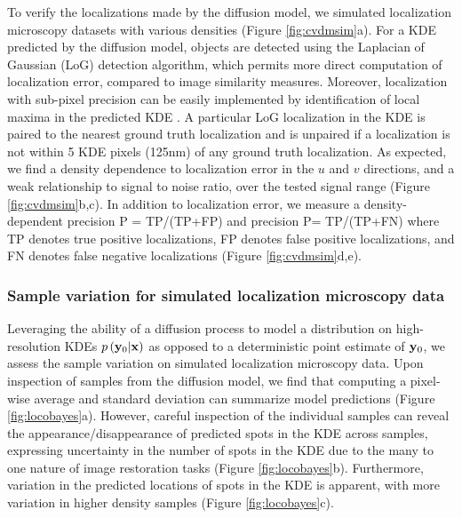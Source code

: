 To verify the localizations made by the diffusion model, we simulated localization microscopy datasets with various densities (Figure \ref{fig:cvdmsim}a). For a KDE predicted by the diffusion model, objects are detected using the Laplacian of Gaussian (LoG) detection algorithm, which permits more direct computation of localization error, compared to image similarity measures. Moreover, localization with sub-pixel precision can be easily implemented by identification of local maxima in the predicted KDE \parencite{Nehme2020}. A particular LoG localization in the KDE is paired to the nearest ground truth localization and is unpaired if a localization is not within 5 KDE pixels (125nm) of any ground truth localization. As expected, we find a density dependence to localization error in the $u$ and $v$ directions, and a weak relationship to signal to noise ratio, over the tested signal range (Figure \ref{fig:cvdmsim}b,c). In addition to localization error, we measure a density-dependent precision P = TP/(TP+FP) and precision P= TP/(TP+FN) where TP denotes true positive localizations, FP denotes false positive localizations, and FN denotes false negative localizations (Figure \ref{fig:cvdmsim}d,e). 

\subsubsection{Sample variation for simulated localization microscopy data}

Leveraging the ability of a diffusion process to model a distribution on high-resolution KDEs $p\left(\bold{y}_0\lvert \bold{x}\right)$ as opposed to a deterministic point estimate of $\bold{y}_0$, we assess the sample variation on simulated localization microscopy data. Upon inspection of samples from the diffusion model, we find that computing a pixel-wise average and standard deviation can summarize model predictions (Figure \ref{fig:locobayes}a). However, careful inspection of the individual samples can reveal the appearance/disappearance of predicted spots in the KDE across samples, expressing uncertainty in the number of spots in the KDE due to the many to one nature of image restoration tasks (Figure \ref{fig:locobayes}b). Furthermore, variation in the predicted locations of spots in the KDE is apparent, with more variation in higher density samples (Figure \ref{fig:locobayes}c). 




